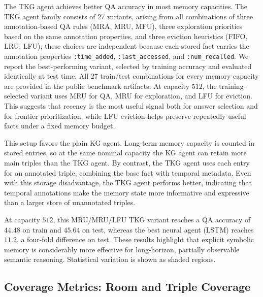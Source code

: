 \documentclass[Afour,sageh,times]{sagej}
\begin{document}
The TKG agent achieves better QA accuracy in most memory capacities. The TKG agent
family consists of 27 variants, arising from all combinations of three annotation-based
QA rules (MRA, MRU, MFU), three exploration priorities based on the same annotation properties, and
three eviction heuristics (FIFO, LRU, LFU); these choices are independent because each
stored fact carries the annotation properties \texttt{:time\_added}, \texttt{:last\_accessed}, and
\texttt{:num\_recalled}. We report the best-performing variant, selected by training
accuracy and evaluated identically at test time. All 27 train/test combinations for
every memory capacity are provided in the public benchmark artifacts. At capacity
$512$, the training-selected variant uses MRU for QA, MRU for exploration, and LFU for
eviction. This suggests that recency is the most useful signal both for answer
selection and for frontier prioritization, while LFU eviction helps preserve repeatedly
useful facts under a fixed memory budget.

This setup favors the plain KG agent. Long-term memory
capacity is counted in stored entries, so at the same nominal capacity the KG agent can
retain more main triples than the TKG agent. By contrast, the TKG agent uses each entry for an annotated
triple, combining the base fact with temporal metadata. Even with this storage
disadvantage, the TKG agent performs better, indicating that temporal annotations make
the memory state more informative and expressive than a larger store of unannotated
triples.

At capacity $512$, this MRU/MRU/LFU TKG variant reaches a QA accuracy of $44.48$ on
train and $45.64$ on test, whereas the best neural agent (LSTM) reaches $11.2$, a
four-fold difference on test. These results highlight that explicit symbolic memory is
considerably more effective for long-horizon, partially observable semantic reasoning.
Statistical variation is shown as shaded regions.

\subsection{Coverage Metrics: Room and Triple Coverage}
\end{document}
